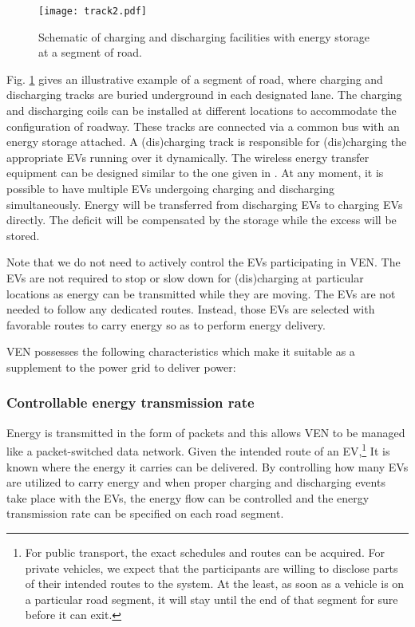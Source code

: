 \documentclass[journal]{IEEEtran}
\begin{document}
\begin{figure}[!t]
\centering
\texttt{[image: track2.pdf]}\vspace{-0.3cm}
\caption{Schematic of charging and discharging facilities with energy storage at a segment of road.}
\label{fig:track}
\vspace{-0.3cm}
\end{figure}
Fig. \ref{fig:track} gives an illustrative example of a segment of road, where charging and discharging tracks are buried underground in each designated lane. The charging and discharging coils can be installed at different locations to accommodate the configuration of roadway. These tracks are connected via a common bus with an energy storage attached. A (dis)charging track is responsible for (dis)charging the appropriate EVs running over it dynamically. The wireless energy transfer equipment can be designed similar to the one given in \cite{OLEV_wireless}. At any moment, it is possible to have multiple EVs undergoing charging and discharging simultaneously. Energy will be transferred from discharging EVs to charging EVs directly. The deficit will be compensated by the storage while the excess will be stored.

Note that we do not need to actively control the EVs participating in VEN. The EVs are not required to stop or slow down for (dis)charging at particular locations as energy can be transmitted  while they are moving. The EVs are not needed to follow any dedicated routes. Instead, those EVs are selected with favorable routes to carry energy so as to perform energy delivery.


\setcounter{subsubsection}{0}
VEN possesses the following characteristics which make it suitable as a supplement to the power grid to deliver power:
\subsubsection{Controllable energy transmission rate}
Energy is transmitted in the form of packets and this allows VEN to be managed like a packet-switched data network. Given the intended route of an EV,\footnote{For public transport, the exact schedules and routes can be acquired. For private vehicles, we expect that the participants are willing to disclose parts of their intended routes to the system. At the least, as soon as a vehicle is on a particular road segment, it will stay until the end of that segment for sure before it can exit.} It is known where the energy it carries can be delivered. By controlling how many EVs are utilized to carry energy and when proper charging and discharging events take place with the EVs, the energy flow can be controlled and the energy transmission rate can be specified on each road segment. 
\end{document}
